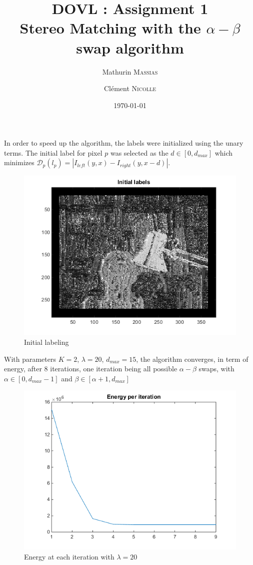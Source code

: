 \documentclass[11pt,a4paper]{article}
\title{DOVL : Assignment 1 \\ Stereo Matching with the $\alpha-\beta$ swap algorithm}
\author{Mathurin \textsc{Massias} \and Clément \textsc{Nicolle}}
\date{\today}
\begin{document}
	
\maketitle

In order to speed up the algorithm, the labels were initialized using the unary terms. The initial label for pixel $p$ was selected as the $d \in \left[ 0, d_{max}\right] $ which minimizes $\mathcal{D}_p(l_p) = |I_{left}(y,x)-I_{right}(y,x-d)|$.

\begin{figure}[!htbp]
	\centering
	\noindent\includegraphics[scale=0.4]{results/initial_lab.png}
	\caption{Initial labeling}
\end{figure}

With parameters $K = 2$, $\lambda = 20$, $d_{max} = 15$, the algorithm converges, in term of energy, after 8 iterations, one iteration being all possible $\alpha-\beta$ swaps, with $\alpha \in \left[ 0, d_{max}-1\right] $ and $\beta \in \left[ \alpha+1, d_{max} \right] $

\begin{figure}[H]
	\centering
	\noindent\includegraphics[scale=0.4]{results/energy.png}
	\caption{Energy at each iteration with $\lambda = 20$}
\end{figure}
\end{document}
